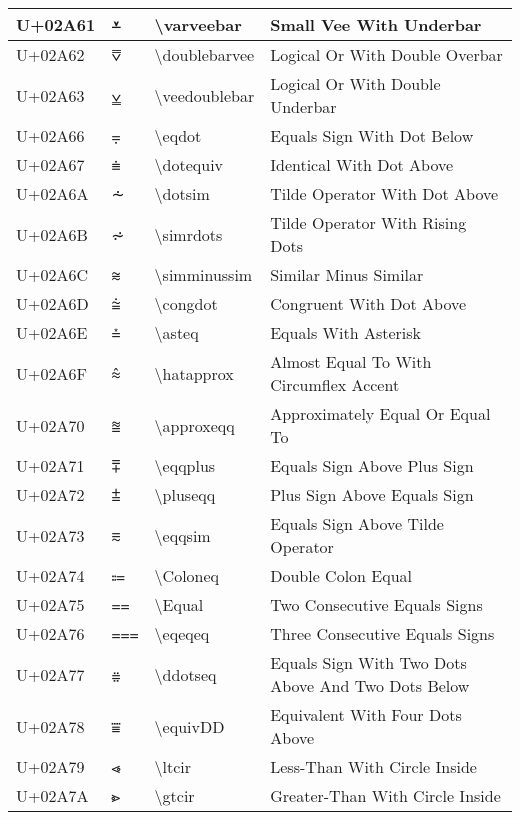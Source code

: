\begin{table}[h]
\begin{tabulary}{\linewidth}{|L|L|L|L|}
\hline
U+02A61 & ⩡ & {\textbackslash}varveebar & Small Vee With Underbar \\
\hline
U+02A62 & ⩢ & {\textbackslash}doublebarvee & Logical Or With Double Overbar \\
\hline
U+02A63 & ⩣ & {\textbackslash}veedoublebar & Logical Or With Double Underbar \\
\hline
U+02A66 & ⩦ & {\textbackslash}eqdot & Equals Sign With Dot Below \\
\hline
U+02A67 & ⩧ & {\textbackslash}dotequiv & Identical With Dot Above \\
\hline
U+02A6A & ⩪ & {\textbackslash}dotsim & Tilde Operator With Dot Above \\
\hline
U+02A6B & ⩫ & {\textbackslash}simrdots & Tilde Operator With Rising Dots \\
\hline
U+02A6C & ⩬ & {\textbackslash}simminussim & Similar Minus Similar \\
\hline
U+02A6D & ⩭ & {\textbackslash}congdot & Congruent With Dot Above \\
\hline
U+02A6E & ⩮ & {\textbackslash}asteq & Equals With Asterisk \\
\hline
U+02A6F & ⩯ & {\textbackslash}hatapprox & Almost Equal To With Circumflex Accent \\
\hline
U+02A70 & ⩰ & {\textbackslash}approxeqq & Approximately Equal Or Equal To \\
\hline
U+02A71 & ⩱ & {\textbackslash}eqqplus & Equals Sign Above Plus Sign \\
\hline
U+02A72 & ⩲ & {\textbackslash}pluseqq & Plus Sign Above Equals Sign \\
\hline
U+02A73 & ⩳ & {\textbackslash}eqqsim & Equals Sign Above Tilde Operator \\
\hline
U+02A74 & ⩴ & {\textbackslash}Coloneq & Double Colon Equal \\
\hline
U+02A75 & ⩵ & {\textbackslash}Equal & Two Consecutive Equals Signs \\
\hline
U+02A76 & ⩶ & {\textbackslash}eqeqeq & Three Consecutive Equals Signs \\
\hline
U+02A77 & ⩷ & {\textbackslash}ddotseq & Equals Sign With Two Dots Above And Two Dots Below \\
\hline
U+02A78 & ⩸ & {\textbackslash}equivDD & Equivalent With Four Dots Above \\
\hline
U+02A79 & ⩹ & {\textbackslash}ltcir & Less-Than With Circle Inside \\
\hline
U+02A7A & ⩺ & {\textbackslash}gtcir & Greater-Than With Circle Inside \\

\end{tabulary}
\end{table}
